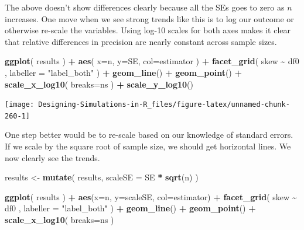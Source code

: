 \documentclass[
]{book}
\newenvironment{Shaded}{\begin{snugshade}}{\end{snugshade}}
\newcommand{\AttributeTok}[1]{\textcolor[rgb]{0.13,0.29,0.53}{#1}}
\newcommand{\FunctionTok}[1]{\textcolor[rgb]{0.13,0.29,0.53}{\textbf{#1}}}
\newcommand{\NormalTok}[1]{#1}
\newcommand{\OtherTok}[1]{\textcolor[rgb]{0.56,0.35,0.01}{#1}}
\newcommand{\SpecialCharTok}[1]{\textcolor[rgb]{0.81,0.36,0.00}{\textbf{#1}}}
\newcommand{\StringTok}[1]{\textcolor[rgb]{0.31,0.60,0.02}{#1}}
\begin{document}
The above doesn't show differences clearly because all the SEs goes to zero as \(n\) increases.
One move when we see strong trends like this is to log our outcome or otherwise re-scale the variables.
Using log-10 scales for both axes makes it clear that relative differences in precision are nearly constant across sample sizes.

\begin{Shaded}
\begin{Highlighting}[]
\FunctionTok{ggplot}\NormalTok{( results ) }\SpecialCharTok{+}
  \FunctionTok{aes}\NormalTok{( }\AttributeTok{x=}\NormalTok{n, }\AttributeTok{y=}\NormalTok{SE, }\AttributeTok{col=}\NormalTok{estimator ) }\SpecialCharTok{+}
  \FunctionTok{facet\_grid}\NormalTok{( skew }\SpecialCharTok{\textasciitilde{}}\NormalTok{ df0 , }\AttributeTok{labeller =} \StringTok{"label\_both"}\NormalTok{ ) }\SpecialCharTok{+}
  \FunctionTok{geom\_line}\NormalTok{() }\SpecialCharTok{+} \FunctionTok{geom\_point}\NormalTok{() }\SpecialCharTok{+}
  \FunctionTok{scale\_x\_log10}\NormalTok{( }\AttributeTok{breaks=}\NormalTok{ns ) }\SpecialCharTok{+}
  \FunctionTok{scale\_y\_log10}\NormalTok{()}
\end{Highlighting}
\end{Shaded}

\begin{center}\texttt{[image: Designing-Simulations-in-R\_files/figure-latex/unnamed-chunk-260-1]} \end{center}

One step better would be to re-scale based on our knowledge of standard errors.
If we scale by the square root of sample size, we should get horizontal lines.
We now clearly see the trends.

\begin{Shaded}
\begin{Highlighting}[]
\NormalTok{results }\OtherTok{\textless{}{-}} \FunctionTok{mutate}\NormalTok{( results, }\AttributeTok{scaleSE =}\NormalTok{ SE }\SpecialCharTok{*} \FunctionTok{sqrt}\NormalTok{(n) )}
\end{Highlighting}
\end{Shaded}

\begin{Shaded}
\begin{Highlighting}[]
\FunctionTok{ggplot}\NormalTok{( results ) }\SpecialCharTok{+}  
  \FunctionTok{aes}\NormalTok{(}\AttributeTok{x=}\NormalTok{n, }\AttributeTok{y=}\NormalTok{scaleSE, }\AttributeTok{col=}\NormalTok{estimator) }\SpecialCharTok{+}
  \FunctionTok{facet\_grid}\NormalTok{( skew }\SpecialCharTok{\textasciitilde{}}\NormalTok{ df0 , }\AttributeTok{labeller =} \StringTok{"label\_both"}\NormalTok{ ) }\SpecialCharTok{+}
  \FunctionTok{geom\_line}\NormalTok{() }\SpecialCharTok{+} \FunctionTok{geom\_point}\NormalTok{() }\SpecialCharTok{+}
  \FunctionTok{scale\_x\_log10}\NormalTok{( }\AttributeTok{breaks=}\NormalTok{ns )}
\end{Highlighting}
\end{Shaded}
\end{document}
